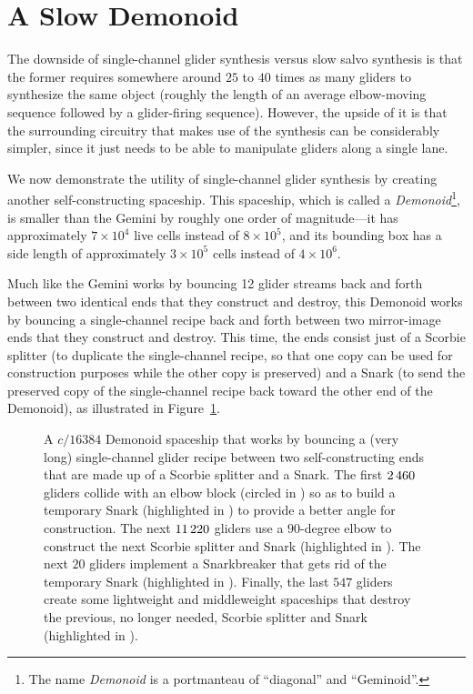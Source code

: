 \section{A Slow Demonoid}\label{sec:slow_demonoid}

The downside of single-channel glider synthesis versus slow salvo synthesis is that the former requires somewhere around $25$ to $40$ times as many gliders to synthesize the same object (roughly the length of an average elbow-moving sequence followed by a glider-firing sequence). However, the upside of it is that the surrounding circuitry that makes use of the synthesis can be considerably simpler, since it just needs to be able to manipulate gliders along a single lane.

We now demonstrate the utility of single-channel glider synthesis by creating another self-constructing spaceship. This spaceship, which is called a \emph{Demonoid}\footnote{The name \emph{Demonoid} is a portmanteau of ``diagonal'' and ``Geminoid''.}, is smaller than the Gemini by roughly one order of magnitude---it has approximately $7 \times 10^4$ live cells instead of $8 \times 10^5$, and its bounding box has a side length of approximately $3 \times 10^5$ cells instead of $4 \times 10^6$.

Much like the Gemini works by bouncing 12 glider streams back and forth between two identical ends that they construct and destroy, this Demonoid works by bouncing a single-channel recipe back and forth between two mirror-image ends that they construct and destroy. This time, the ends consist just of a Scorbie splitter (to duplicate the single-channel recipe, so that one copy can be used for construction purposes while the other copy is preserved) and a Snark (to send the preserved copy of the single-channel recipe back toward the other end of the Demonoid), as illustrated in Figure~\ref{fig:slow_demonoid}.

\begin{figure}[!htbp]
	\centering
	\caption{A $c/16384$ Demonoid spaceship that works by bouncing a (very long) single-channel glider recipe between two self-constructing ends that are made up of a Scorbie splitter and a Snark. The first $2{\,}460$ gliders collide with an elbow block (circled in ) so as to build a temporary Snark (highlighted in ) to provide a better angle for construction. The next $11{\,}220$ gliders use a $90$-degree elbow to construct the next Scorbie splitter and Snark (highlighted in ). The next $20$ gliders implement a Snarkbreaker that gets rid of the temporary Snark (highlighted in ). Finally, the last $547$ gliders create some lightweight and middleweight spaceships that destroy the previous, no longer needed, Scorbie splitter and Snark (highlighted in ).}\label{fig:slow_demonoid}
\end{figure}


